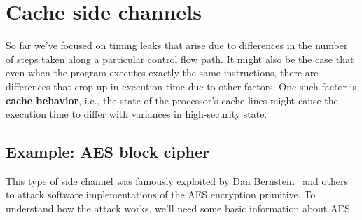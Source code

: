 \documentclass[11pt,twoside]{scrartcl}
\begin{document}
\section{Cache side channels}

So far we've focused on timing leaks that arise due to differences in the number of steps taken along a particular control flow path. It might also be the case that even when the program executes exactly the same instructions, there are differences that crop up in execution time due to other factors. One such factor is \textbf{cache behavior}, i.e., the state of the processor's cache lines might cause the execution time to differ with variances in high-security state.


\subsection{Example: AES block cipher}
This type of side channel was famously exploited by Dan Bernstein~\cite{Bernstein04} and others to attack software implementations of the AES encryption primitive. To understand how the attack works, we'll need some basic information about AES. 
\end{document}
